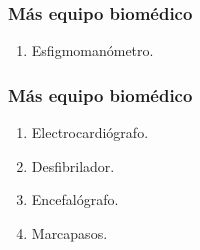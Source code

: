 \documentclass[14pt]{beamer}
\begin{document}
\begin{frame}
\frametitle{Más equipo biomédico}
\begin{enumerate}[<+->]
\item Esfigmomanómetro.
\seti
\end{enumerate}
\end{frame}
\begin{frame}
\frametitle{Más equipo biomédico}
\begin{enumerate}[<+->]
    
\item Electrocardiógrafo.
\item Desfibrilador.
\item Encefalógrafo.
\item Marcapasos.
\end{enumerate}
\end{frame}
\end{document}
